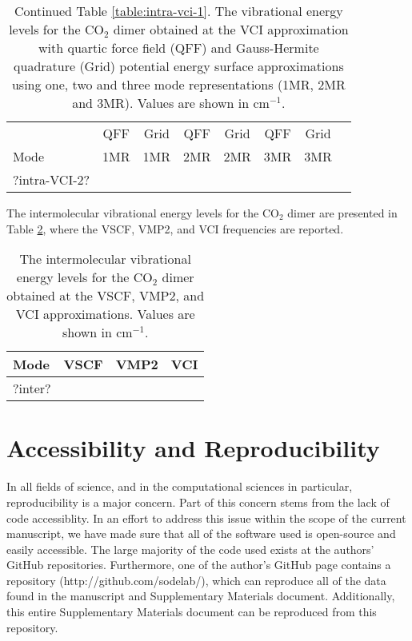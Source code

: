 \documentclass[aip,jcp,showpacs,superscriptaddress,groupedaddress]{revtex4-1}  %
\begin{document}
\begin{table}[b]
\caption{Continued Table \ref{table:intra-vci-1}. The vibrational energy levels for the CO$_2$ dimer obtained at the VCI approximation with quartic force field (QFF) and Gauss-Hermite quadrature (Grid) potential energy surface approximations using one, two and three mode representations (1MR, 2MR and 3MR). Values are shown in cm$^{-1}$.}
\begin{ruledtabular}
\begin{tabular}{lccccccc}
    & QFF &  Grid & QFF & Grid & QFF & Grid   \\  
  Mode & 1MR & 1MR & 2MR & 2MR & 3MR & 3MR   \\ 
\hline \Tstrut
?intra-VCI-2?
\end{tabular}
\end{ruledtabular}
\label{table:intra-vci-2}
\end{table}

The intermolecular vibrational energy levels for the CO$_2$ dimer are presented in Table \ref{table:inter}, where the VSCF, VMP2, and VCI frequencies are reported.

\begin{table}[H]
\caption{The intermolecular vibrational energy levels for the CO$_2$ dimer obtained at the VSCF, VMP2, and VCI approximations. Values are shown in cm$^{-1}$.}
\begin{ruledtabular}
\begin{tabular}{lccc}
  Mode & VSCF & VMP2 & VCI    \\ 
\hline \Tstrut
?inter?
\end{tabular}
\end{ruledtabular}
\label{table:inter}
\end{table}


\section[S3]{\label{sec:reproduce}Accessibility and Reproducibility}
In all fields of science, and in the computational sciences in particular, reproducibility is a major concern. Part of this concern stems from the lack of code accessiblity. In an effort to address this issue within the scope of the current manuscript, we have made sure that all of the software used is open-source and easily accessible.\cite{} The large majority of the code used exists at the authors' GitHub repositories.\cite{} Furthermore, one of the author's GitHub page contains a repository\cite{} (http://github.com/sodelab/), which can reproduce all of the data found in the manuscript and Supplementary Materials document. Additionally, this entire Supplementary Materials document can be reproduced from this repository. 
\end{document}
